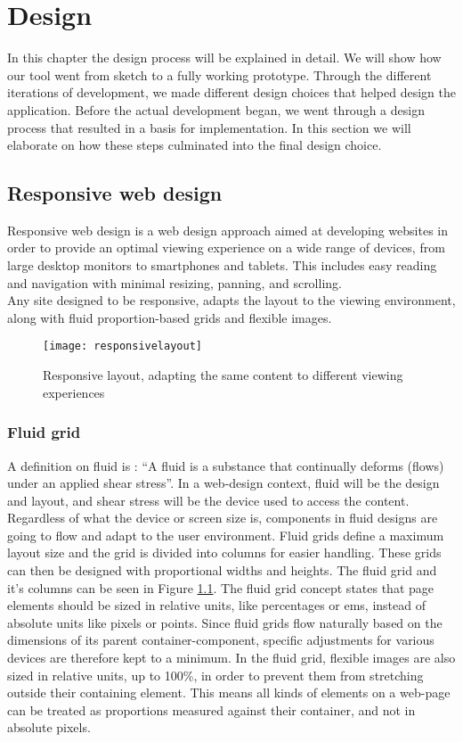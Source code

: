 \chapter{Design}
\label{chap:design}
In this chapter the design process will be explained in detail. We will show how our tool went from sketch to a fully working prototype. 
Through the different iterations of development, we made different design choices that helped design the application. Before the actual development began, we went
through a design process that resulted in a basis for implementation. In this section we will elaborate on how these steps culminated into the final design choice.
\section{Responsive web design}
Responsive web design\citep{responsivearticle} is a web design approach aimed at developing websites in order to provide an optimal viewing experience on a wide range of devices, from large desktop monitors to smartphones and tablets. This includes easy reading and navigation with minimal resizing, panning, and scrolling.\\
Any site designed to be responsive, adapts the layout to the viewing environment, along with fluid proportion-based grids and flexible images.\\
\begin{figure}[h!]
\centering
	\texttt{[image: responsivelayout]}
\caption{Responsive layout, adapting the same content to different viewing experiences}
\label{responsivelayout}
\end{figure}

\subsection{Fluid grid}
A definition on fluid is : ``A fluid is a substance that continually deforms (flows) under an applied shear stress''\citep{fluidgrid}. In a web-design context, fluid will be the design and layout, and shear stress will be the device used to access the content.
Regardless of what the device or screen size is, components in fluid designs are going to flow and adapt to the user environment. Fluid grids define a maximum layout size and the grid is divided into columns for easier handling. These grids can then be designed with proportional widths and heights. The fluid grid and it's columns can be seen in Figure \ref{responsivelayout}.
The fluid grid\citep{fluidgrid, fluidarticle} concept states that page elements should be sized in relative units, like percentages or ems, instead of absolute units like pixels or points. Since fluid grids flow naturally based on the dimensions of its parent container-component, specific adjustments for various devices are therefore kept to a minimum. In the fluid grid, flexible images are also sized in relative units, up to 100\%, in order to prevent them from stretching outside their containing element\citep{fluidimages}. This means all kinds of elements on a web-page can be treated as proportions measured against their container, and not in absolute pixels. 

